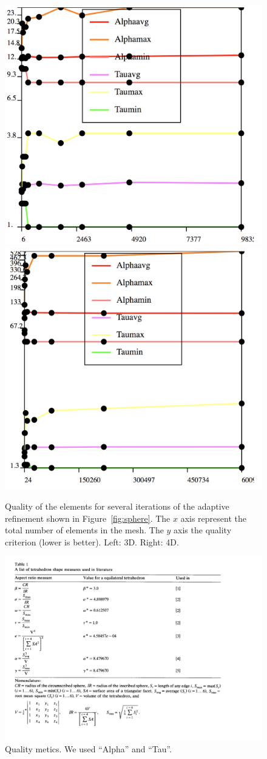 \documentclass{article}
\begin{document}
\begin{figure}[htbp]
	\centering
	\includegraphics[width=0.48\linewidth]{figures/quality3} \hfill
	\includegraphics[width=0.48\linewidth]{figures/quality4} 
	\caption{Quality of the elements for several iterations of the adaptive refinement shown in Figure~\ref{fig:sphere}. The $x$ axis represent the total number of elements in the mesh. The $y$ axis the quality criterion (lower is better).
	 Left: 3D. Right: 4D.}
	\label{fig:quality}
\end{figure}

\begin{figure}[htbp]
	\centering
	\includegraphics[width=0.8\linewidth]{figures/quality_metrics}
	\caption{Quality metics. We used ``Alpha'' and ``Tau''. }
	\label{fig:metrics}
\end{figure}
\end{document}
